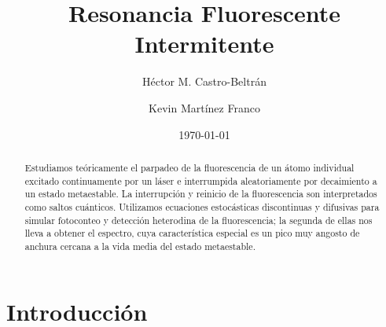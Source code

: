 \documentclass[superscriptaddress,12pt,amsmath]{revtex4-2}
\begin{document}
 

\title{Resonancia Fluorescente Intermitente}  
 
\author{H\'ector M. Castro-Beltr\'an} 
\author{Kevin Mart\'inez Franco} 

\date{\today}
\begin{abstract}
Estudiamos te\'oricamente el parpadeo de la fluorescencia de un \'atomo 
individual excitado continuamente por un l\'aser e interrumpida aleatoriamente 
por decaimiento a un estado metaestable. La interrupci\'on y reinicio de la 
fluorescencia son interpretados como saltos cu\'anticos. Utilizamos 
ecuaciones estoc\'asticas discontinuas y difusivas para simular 
fotoconteo y detecci\'on heterodina de la fluorescencia; la segunda de 
ellas nos lleva a obtener el espectro, cuya caracter\'istica especial es un 
pico muy angosto de anchura cercana a la vida media del estado metaestable. 
\end{abstract}

\maketitle

\section{Introducci\'on}
\end{document}
